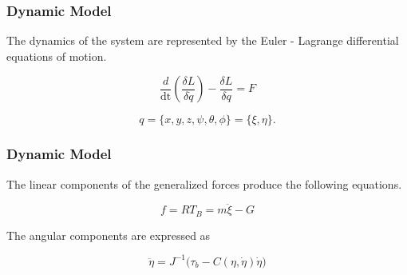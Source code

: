 \documentclass{beamer}
\begin{document}

\begin{frame}
\frametitle{Dynamic Model}

\noindent The dynamics of the system are represented by the Euler - Lagrange differential equations of motion.

\begin{equation}
    \frac{d}{\text{dt}} \left( \frac{\delta  L} {\delta \dot{q}}\right) - \frac{\delta  L}{\delta q}=F 
\end{equation}

\begin{equation}
 q = \{x,y,z,\psi ,\theta ,\phi \} = \{ \xi , \eta \}  .
\end{equation}

\end{frame}




\begin{frame}
\frametitle{Dynamic Model}

\noindent The linear components of the generalized forces produce the following equations.

\begin{equation}
    \label{linforce}
    f =  R  T_B = m \ddot{ \xi} -  G
\end{equation}


\noindent The angular components are expressed as

\begin{equation}
    \label{eq:angularacc}
    \ddot{\eta} = J^{-1} \big( \tau_b - C(\eta,\dot{\eta}) \dot{\eta} \big) 
\end{equation}



\end{frame}



\end{document}
